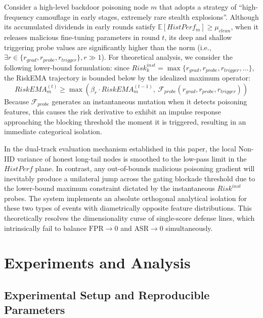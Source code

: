 \documentclass[runningheads]{llncs}
\begin{document}
\begin{lemma}
Consider a high-level backdoor poisoning node $m$ that adopts a strategy of ``high-frequency camouflage in early stages, extremely rare stealth explosions''. Although its accumulated dividends in early rounds satisfy $\mathbb{E}[HistPerf_m] \ge \mu_{clean}$, when it releases malicious fine-tuning parameters in round $t$, its deep and shallow triggering probe values are significantly higher than the norm (i.e., $\exists r \in \{r_{grad}, r_{probe}, r_{trigger}\}, r \gg 1$). For theoretical analysis, we consider the following lower-bound formulation: since $Risk_k^{inst} = \max\{r_{grad}, r_{probe}, r_{trigger}, \dots\}$, the RiskEMA trajectory is bounded below by the idealized maximum operator:
\begin{equation}
    RiskEMA_m^{(t)} \ge \max \left( \beta_r \cdot RiskEMA_m^{(t-1)},\ \mathcal{F}_{probe}(r_{grad}, r_{probe}, r_{trigger}) \right)
\end{equation}
Because $\mathcal{F}_{probe}$ generates an instantaneous mutation when it detects poisoning features, this causes the risk derivative to exhibit an impulse response approaching the blocking threshold the moment it is triggered, resulting in an immediate categorical isolation.
\end{lemma}

\begin{theorem}
In the dual-track evaluation mechanism established in this paper, the local Non-IID variance of honest long-tail nodes is smoothed to the low-pass limit in the $HistPerf$ plane. In contrast, any out-of-bounds malicious poisoning gradient will inevitably produce a unilateral jump across the gating blockade threshold due to the lower-bound maximum constraint dictated by the instantaneous $Risk^{inst}$ probes. The system implements an absolute orthogonal analytical isolation for these two types of events with diametrically opposite feature distributions. This theoretically resolves the dimensionality curse of single-score defense lines, which intrinsically fail to balance $\text{FPR} \to 0$ and $\text{ASR} \to 0$ simultaneously.
\end{theorem}

\section{Experiments and Analysis}
\label{sec:experiments}
\subsection{Experimental Setup and Reproducible Parameters}
\end{document}

